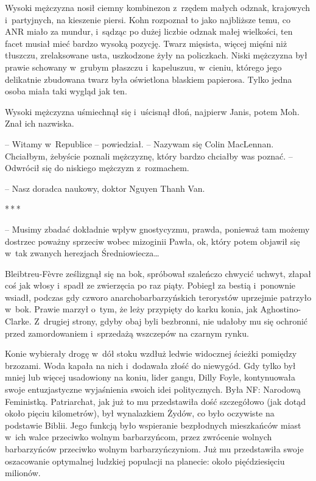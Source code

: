 \documentclass[oneside,polish,11pt,sfheadings]{mwbk}
\newcommand{\threeast}{\bigskip\par\centerline{*\,*\,*}\medskip\par}%
\begin{document}
Wysoki mężczyzna nosił ciemny kombinezon z~rzędem małych odznak,
krajowych i~partyjnych, na kieszenie piersi. Kohn rozpoznał to jako
najbliższe temu, co ANR miało za mundur, i~sądząc po dużej liczbie
odznak małej wielkości, ten facet musiał mieć bardzo wysoką pozycję.
Twarz mięsista, więcej mięśni niż tłuszczu, zrelaksowane usta,
uszkodzone żyły na policzkach. Niski mężczyzna był prawie schowany w~grubym płaszczu i~kapeluszuu, w~cieniu, którego jego delikatnie
zbudowana twarz była oświetlona blaskiem papierosa. Tylko jedna osoba
miała taki wygląd jak ten.

Wysoki mężczyzna uśmiechnął się i~uścisnął dłoń, najpierw Janis, potem
Moh. Znał ich nazwiska.

-- Witamy w~Republice -- powiedział. -- Nazywam się Colin MacLennan.
Chciałbym, żebyście poznali mężczyznę, który bardzo chciałby was poznać.
-- Odwrócił się do niskiego mężczyzn z~rozmachem.

-- Nasz doradca naukowy, doktor Nguyen Thanh Van.
  \threeast 

-- Musimy zbadać dokładnie wpływ gnostycyzmu, prawda, ponieważ tam możemy
dostrzec poważny sprzeciw wobec mizoginii Pawła, ok, który potem objawił
się w~tak zwanych herezjach Średniowiecza\ldots

Bleibtreu-Fèvre ześlizgnął się na bok, spróbował szaleńczo chwycić
uchwyt, złapał coś jak włosy i~spadł ze zwierzęcia po raz piąty. Pobiegł
za bestią i~ponownie wsiadł, podczas gdy czworo anarchobarbarzyńskich
terorystów uprzejmie patrzyło w~bok. Prawie marzył o~tym, że leży
przypięty do karku konia, jak Aghostino-Clarke. Z~drugiej strony, gdyby
obaj byli bezbronni, nie udałoby mu się ochronić przed zamordowaniem i~sprzedażą wszczepów na czarnym rynku.

Konie wybierały drogę w~dół stoku wzdłuż ledwie widocznej ścieżki
pomiędzy brzozami. Woda kapała na nich i~dodawała złość do niewygód. Gdy
tylko był mniej lub więcej usadowiony na koniu, lider gangu, Dilly
Foyle, kontynuowała swoje entuzjastyczne wyjaśnienia swoich idei
politycznych. Była NF: Narodową Feministką. Patriarchat, jak już to mu
przedstawiła dość szczegółowo (jak dotąd około pięciu kilometrów), był
wynalazkiem Żydów, co było oczywiste na podstawie Biblii. Jego funkcją
było wspieranie bezpłodnych mieszkańców miast w~ich walce przeciwko
wolnym barbarzyńcom, przez zwrócenie wolnych barbarzyńców przeciwko
wolnym barbarzyńczyniom. Już mu przedstawiła swoje oszacowanie
optymalnej ludzkiej populacji na planecie: około pięćdziesięciu
milionów.
\end{document}
